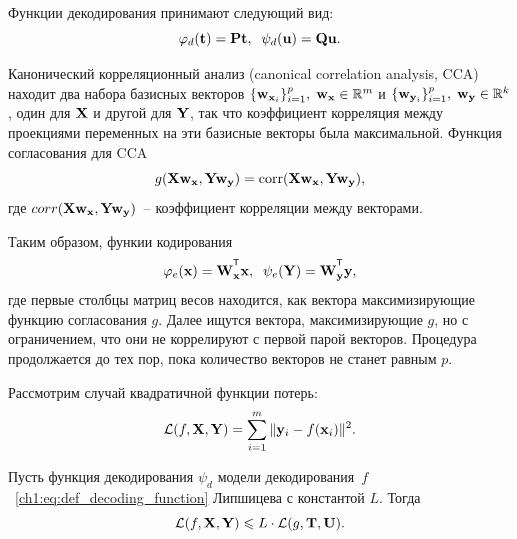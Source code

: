 Функции декодирования принимают следующий вид:
\begin{equation}
	\varphi_d(\mathbf{t}) = \mathbf{P}\mathbf{t}, \;\;
	\psi_d(\mathbf{u}) = \mathbf{Q}\mathbf{u}.
\end{equation} 

\hrulefill

Канонический корреляционный анализ (canonical correlation analysis, CCA) находит два набора базисных векторов $\{\mathbf{w}_{\mathbf{x}_i}\}_{i=1}^{p}, \; \mathbf{w}_{\mathbf{x}} \in \mathbb{R}^{m}$ и $\{\mathbf{w}_{\mathbf{y}_i}\}_{i=1}^{p}, \; \mathbf{w}_{\mathbf{y}} \in \mathbb{R}^{k}$, один для $\mathbf{X}$ и другой для $\mathbf{Y}$, так что коэффициент корреляция между проекциями переменных на эти базисные векторы была максимальной. Функция согласования для CCA
\begin{equation}
	g(\mathbf{X} \mathbf{w}_{\mathbf{x}}, \mathbf{Y} \mathbf{w}_{\mathbf{y}}) = \text{corr}(\mathbf{X} \mathbf{w}_{\mathbf{x}}, \mathbf{Y} \mathbf{w}_{\mathbf{y}}),
\end{equation} 
где $corr(\mathbf{X} \mathbf{w}_{\mathbf{x}}, \mathbf{Y} \mathbf{w}_{\mathbf{y}})$~-- коэффициент корреляции между векторами.

Таким образом, функии кодирования
\begin{equation}
	\varphi_e(\bx) = \bW_{\bx}^{\T}\bx , \;\;
	\psi_e(\bY) = \bW_{\by}^{\T}\by ,
\end{equation}
где первые столбцы матриц весов находится, как вектора максимизирующие функцию согласования $g$. Далее ищутся вектора, максимизирующие $g$, но с ограничением, что они не коррелируют с первой парой векторов. Процедура продолжается до тех пор, пока количество векторов не станет равным $p$. 
 
\hrulefill
 
Рассмотрим случай квадратичной функции потерь:
\[
\mathcal{L}(f, \mathbf{X}, \mathbf{Y}) = \sum_{i=1}^m \| \mathbf{y}_i - f(\mathbf{x}_i) \|^2.
\]

\begin{statement}
	\label{ch1:st:decod_lip}
	Пусть функция декодирования $\psi_d$ модели декодирования~$f$~\eqref{ch1:eq:def_decoding_function} Липшицева с константой $L$. Тогда 
	\[
		\mathcal{L}(f, \mathbf{X}, \mathbf{Y}) \leqslant L \cdot \mathcal{L}(g, \mathbf{T}, \mathbf{U}).
	\]
\end{statement}


